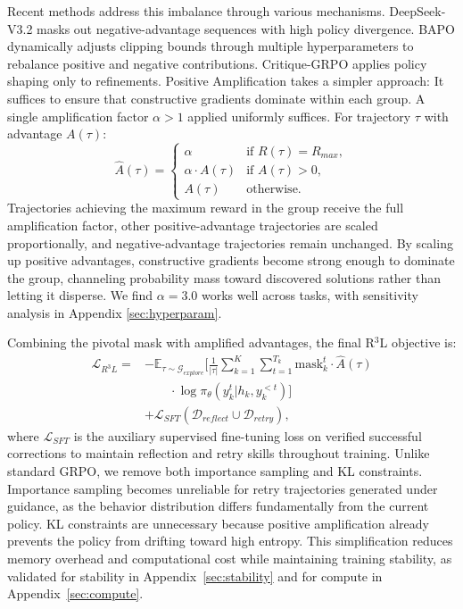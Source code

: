 \documentclass{article} %
\theoremstyle{definition}
\theoremstyle{remark}
\let\cite\citep
\begin{document}
Recent methods address this imbalance through various mechanisms. DeepSeek-V3.2 \cite{liu2025deepseek32} masks out negative-advantage sequences with high policy divergence. BAPO \cite{xi2025bapo} dynamically adjusts clipping bounds through multiple hyperparameters to rebalance positive and negative contributions. Critique-GRPO \cite{zhang2025critique} applies policy shaping only to refinements. Positive Amplification takes a simpler approach: It suffices to ensure that constructive gradients dominate within each group. A single amplification factor $\alpha > 1$ applied uniformly suffices. For trajectory $\tau$ with advantage $A(\tau)$:
\begin{equation}
\label{eq:reweight_advantage}
    \hat{A}(\tau) = \begin{cases}
    \alpha & \text{if } R(\tau) = R_{max}, \\
    \alpha \cdot A(\tau) & \text{if } A(\tau) > 0, \\
    A(\tau) & \text{otherwise}.
    \end{cases}
\end{equation}
Trajectories achieving the maximum reward in the group receive the full amplification factor, other positive-advantage trajectories are scaled proportionally, and negative-advantage trajectories remain unchanged. By scaling up positive advantages, constructive gradients become strong enough to dominate the group, channeling probability mass toward discovered solutions rather than letting it disperse. We find $\alpha=3.0$ works well across tasks, with sensitivity analysis in Appendix \ref{sec:hyperparam}.

Combining the pivotal mask with amplified advantages, the final R$^3$L objective is:
\begin{equation}
\begin{split}
    \mathcal{L}_{R^3L} = & -\mathbb{E}_{\tau \sim \mathcal{G}_{explore}} \bigg[ \frac{1}{|\tau|} \sum_{k=1}^{K} \sum_{t=1}^{T_k} \text{mask}_k^t \cdot \hat{A}(\tau) \\
    & \qquad \cdot \log \pi_{\theta}(y_k^t | h_k, y_k^{<t}) \bigg] \\
    & + \mathcal{L}_{SFT}(\mathcal{D}_{reflect} \cup \mathcal{D}_{retry}),
\end{split}
\label{eq:R3L}
\end{equation}
where $\mathcal{L}_{SFT}$ is the auxiliary supervised fine-tuning loss on verified successful corrections to maintain reflection and retry skills throughout training. Unlike standard GRPO, we remove both importance sampling and KL constraints. Importance sampling becomes unreliable for retry trajectories generated under guidance, as the behavior distribution differs fundamentally from the current policy. KL constraints are unnecessary because positive amplification already prevents the policy from drifting toward high entropy. This simplification reduces memory overhead and computational cost while maintaining training stability, as validated for stability in Appendix~\ref{sec:stability} and for compute in Appendix~\ref{sec:compute}.
\end{document}
